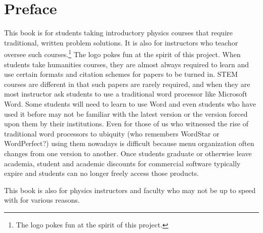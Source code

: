 

\chapter{Preface}
This book is for students taking introductory physics courses that require
traditional, written problem solutions.
It is also for instructors who teachor oversee such courses.\footnote{The \LaPhYs{} 
logo pokes fun at the spirit of this project.}
The \LaPhYs{} logo pokes fun at the spirit of this 
project. When students take humanities courses, they are almost always 
required to learn and use certain formats and citation schemes for 
papers to be turned in. STEM courses are different in that such papers
are rarely required, and when they are most instructor ask students to use a
traditional word processor like Microsoft Word. Some students will need to
learn to use Word and even students who have used it before may not be
familiar with the latest version or the version forced upon them by their
institutions. Even for those of us who witnessed the rise of traditional
word processors to ubiquity (who remembers WordStar or WordPerfect?) using 
them nowadays is difficult because menu organization often changes from one
version to another. Once students graduate or otherwise leave academia, 
student and academic discounts for commercial software typically expire and
students can no longer freely access those products.

This book is also for physics instructors and faculty who may not be up to
speed with \LaTeXe{} for various reasons.

\LaPhYs

\large\LaPhYs

\Large\LaPhYs

\LARGE\LaPhYs

\huge\LaPhYs

\Huge\LaPhYs

\normalsize
